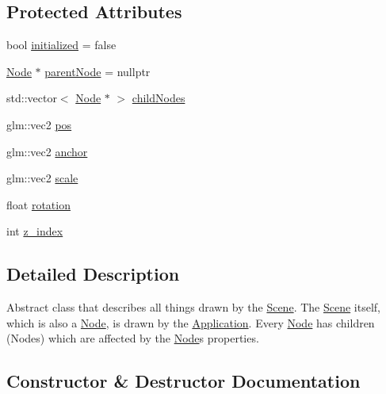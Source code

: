\subsection*{Protected Attributes}
\begin{DoxyCompactItemize}
\item 
bool \mbox{\hyperlink{classsage_1_1Node_a2c2cf2d54ee6a9368ece7ea46ad13deb}{initialized}} = false
\item 
\mbox{\hyperlink{classsage_1_1Node}{Node}} $\ast$ \mbox{\hyperlink{classsage_1_1Node_a9f6d79896df762b8e8cff9574f1e9262}{parent\+Node}} = nullptr
\item 
std\+::vector$<$ \mbox{\hyperlink{classsage_1_1Node}{Node}} $\ast$ $>$ \mbox{\hyperlink{classsage_1_1Node_a296882fbf277d09cb672da2275aa5527}{child\+Nodes}}
\item 
glm\+::vec2 \mbox{\hyperlink{classsage_1_1Node_a7e0ae6eeb84fae60e54e6685c982b0b2}{pos}}
\item 
glm\+::vec2 \mbox{\hyperlink{classsage_1_1Node_a0956f07efec6dcbd3cf796a9028b9175}{anchor}}
\item 
glm\+::vec2 \mbox{\hyperlink{classsage_1_1Node_a3014b585d97d3a449e83bc0252db0c50}{scale}}
\item 
float \mbox{\hyperlink{classsage_1_1Node_ae83b239ad4c722fee62708977e0560f4}{rotation}}
\item 
int \mbox{\hyperlink{classsage_1_1Node_ad98383ce93e985bf20e1cd678c622097}{z\+\_\+index}}
\end{DoxyCompactItemize}


\subsection{Detailed Description}
Abstract class that describes all things drawn by the \mbox{\hyperlink{classsage_1_1Scene}{Scene}}. The \mbox{\hyperlink{classsage_1_1Scene}{Scene}} itself, which is also a \mbox{\hyperlink{classsage_1_1Node}{Node}}, is drawn by the \mbox{\hyperlink{classsage_1_1Application}{Application}}. Every \mbox{\hyperlink{classsage_1_1Node}{Node}} has children (Nodes) which are affected by the \mbox{\hyperlink{classsage_1_1Node}{Node}}\textquotesingle{}s properties. 

\subsection{Constructor \& Destructor Documentation}
\mbox{\label{classsage_1_1Node_ad7a34779cad45d997bfd6d3d8043c75f}} 
